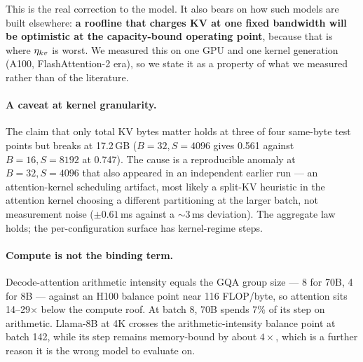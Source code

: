 This is the real correction to the model. It also bears on how such models are
built elsewhere: \textbf{a roofline that charges KV at one fixed bandwidth will
be optimistic at the capacity-bound operating point}, because that is where
$\eta_{kv}$ is worst. We measured this on one GPU and one kernel generation
(A100, FlashAttention-2 era), so we state it as a property of what we measured
rather than of the literature.

\paragraph{A caveat at kernel granularity.} The claim that only total KV bytes
matter holds at three of four same-byte test points but breaks at 17.2\,GB
($B{=}32,S{=}4096$ gives 0.561 against $B{=}16,S{=}8192$ at 0.747). The cause
is a reproducible anomaly at $B{=}32,S{=}4096$ that also appeared in an
independent earlier run --- an attention-kernel scheduling artifact, most
likely a split-KV heuristic in the attention kernel choosing a different
partitioning at the larger batch, not measurement noise ($\pm0.61$\,ms
against a $\sim$3\,ms deviation). The aggregate law holds; the
per-configuration surface has kernel-regime steps.

\paragraph{Compute is not the binding term.} Decode-attention arithmetic
intensity equals the GQA group size --- 8 for 70B, 4 for 8B --- against an
H100 balance point near 116 FLOP/byte, so attention sits 14--29$\times$ below
the compute roof. At batch 8, 70B spends 7\% of its step on arithmetic.
Llama-8B at 4K crosses the arithmetic-intensity balance point at batch 142, while its step remains memory-bound by about $4\times$, which is a further
reason it is the wrong model to evaluate on.

